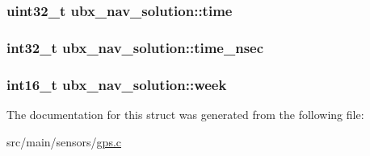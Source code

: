 \hypertarget{structubx__nav__solution_aae9f8b563b5be705a41b809bc84149fe}{
\subsubsection[{time}]{\setlength{\rightskip}{0pt plus 5cm}uint32\+\_\+t ubx\+\_\+nav\+\_\+solution\+::time}}\label{structubx__nav__solution_aae9f8b563b5be705a41b809bc84149fe}
\hypertarget{structubx__nav__solution_a4ff7e85c5050ca078e2c3530dc25c5c3}{
\subsubsection[{time\+\_\+nsec}]{\setlength{\rightskip}{0pt plus 5cm}int32\+\_\+t ubx\+\_\+nav\+\_\+solution\+::time\+\_\+nsec}}\label{structubx__nav__solution_a4ff7e85c5050ca078e2c3530dc25c5c3}
\hypertarget{structubx__nav__solution_aebadda223c5339745fb587f467ebed19}{
\subsubsection[{week}]{\setlength{\rightskip}{0pt plus 5cm}int16\+\_\+t ubx\+\_\+nav\+\_\+solution\+::week}}\label{structubx__nav__solution_aebadda223c5339745fb587f467ebed19}


The documentation for this struct was generated from the following file\+:\begin{DoxyCompactItemize}
\item 
src/main/sensors/\hyperlink{gps_8c}{gps.\+c}\end{DoxyCompactItemize}

